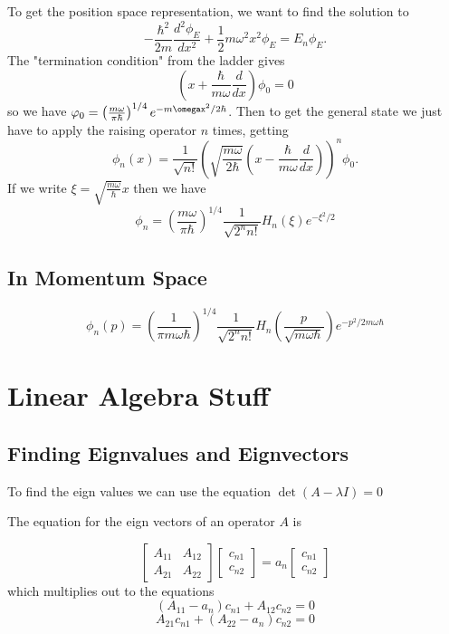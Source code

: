 \documentclass{homework}
\newcommand{\m}[1]{\begin{bmatrix} #1 \end{bmatrix}}
\begin{document}
To get the position space representation, we want to find the solution to 
\[-\frac{\hbar^2}{2m}\frac{d^2\phi_E}{dx^2}+ \frac{1}{2}m\omega^2 x^2 \phi_E = E_n \phi_E.\]
The "termination condition" from the ladder gives
\[(x+ \frac{\hbar}{m\omega}\frac{d}{dx})\phi_0 = 0\]
so we have $\phi_0 = \left( \frac{m\omega}{\pi\hbar}\right)^{1/4}e^{-m\omegax^2/2\hbar}$. Then to get the general state we just have to apply the raising operator $n$ times, getting
\[\phi_n(x) = \frac{1}{\sqrt{n!}}\left( \sqrt{\frac{m\omega}{2\hbar}}(x  - \frac{\hbar}{m\omega}\frac{d}{dx})\right)^n\phi_0.\]
If we write $\xi = \sqrt{\frac{m\omega}{\hbar}}x$ then we have 
\[\phi_n = \left( \frac{m\omega}{\pi \hbar}\right)^{1/4}\frac{1}{\sqrt{2^nn!}}H_n(\xi)e^{-\xi^2/2}\]

\subsection{In Momentum Space}
\[\phi_n(p) = \left(\frac{1}{\pi m \omega \hbar} \right)^{1/4}\frac{1}{\sqrt{2^nn!}}H_n(\frac{p}{\sqrt{m\omega\hbar}})e^{-p^2/2m\omega\hbar}\]






\section{Linear Algebra Stuff}


\subsection{Finding Eignvalues and Eignvectors}

To find the eign values we can use the equation $\det(A - \lambda I) = 0$

The equation for the eign vectors of an operator $A$ is 

\[\m{A_{11} & A_{12} \\ A_{21} & A_{22}}\m{c_{n1} \\ c_{n2}} = a_n \m{c_{n1} \\ c_{n2}}\]
which multiplies out to the equations
\[(A_{11} - a_n)c_{n1} + A_{12}c_{n2} = 0\]
\[A_{21}c_{n1}+ (A_{22}- a_n)c_{n2} = 0\]
\end{document}
